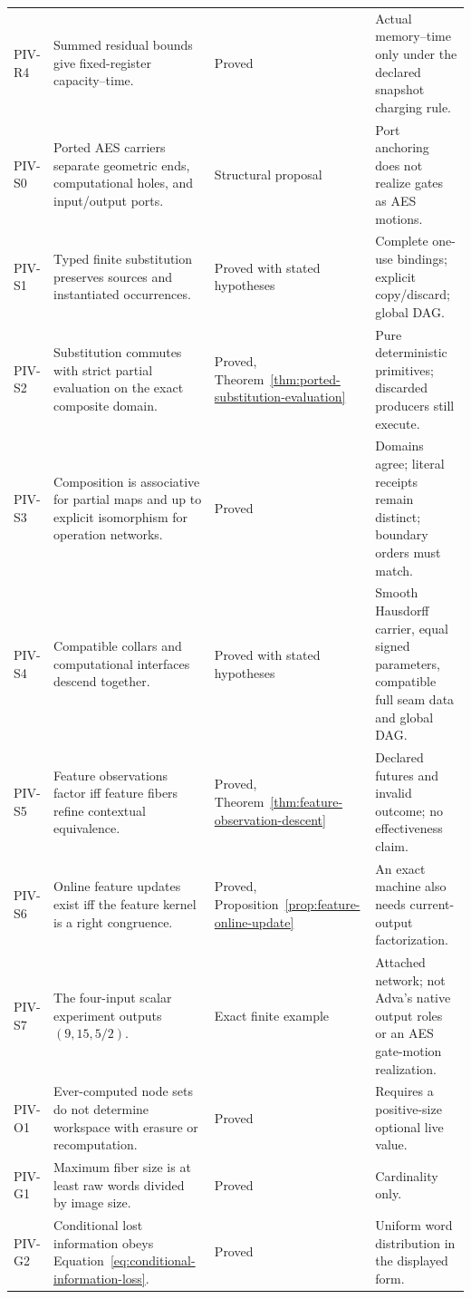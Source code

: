 \begin{longtable}{L{0.10\textwidth}L{0.36\textwidth}L{0.13\textwidth}L{0.24\textwidth}}
PIV-R4 & Summed residual bounds give fixed-register capacity--time. & Proved & Actual memory--time only under the declared snapshot charging rule.\\
PIV-S0 & Ported AES carriers separate geometric ends, computational holes, and input/output ports. & Structural proposal & Port anchoring does not realize gates as AES motions.\\
PIV-S1 & Typed finite substitution preserves sources and instantiated occurrences. & Proved with stated hypotheses & Complete one-use bindings; explicit copy/discard; global DAG.\\
PIV-S2 & Substitution commutes with strict partial evaluation on the exact composite domain. & Proved, Theorem~\ref{thm:ported-substitution-evaluation} & Pure deterministic primitives; discarded producers still execute.\\
PIV-S3 & Composition is associative for partial maps and up to explicit isomorphism for operation networks. & Proved & Domains agree; literal receipts remain distinct; boundary orders must match.\\
PIV-S4 & Compatible collars and computational interfaces descend together. & Proved with stated hypotheses & Smooth Hausdorff carrier, equal signed parameters, compatible full seam data and global DAG.\\
PIV-S5 & Feature observations factor iff feature fibers refine contextual equivalence. & Proved, Theorem~\ref{thm:feature-observation-descent} & Declared futures and invalid outcome; no effectiveness claim.\\
PIV-S6 & Online feature updates exist iff the feature kernel is a right congruence. & Proved, Proposition~\ref{prop:feature-online-update} & An exact machine also needs current-output factorization.\\
PIV-S7 & The four-input scalar experiment outputs $(9,15,5/2)$. & Exact finite example & Attached network; not Adva's native output roles or an AES gate-motion realization.\\
PIV-O1 & Ever-computed node sets do not determine workspace with erasure or recomputation. & Proved & Requires a positive-size optional live value.\\
PIV-G1 & Maximum fiber size is at least raw words divided by image size. & Proved & Cardinality only.\\
PIV-G2 & Conditional lost information obeys Equation~\eqref{eq:conditional-information-loss}. & Proved & Uniform word distribution in the displayed form.\\

\end{longtable}
